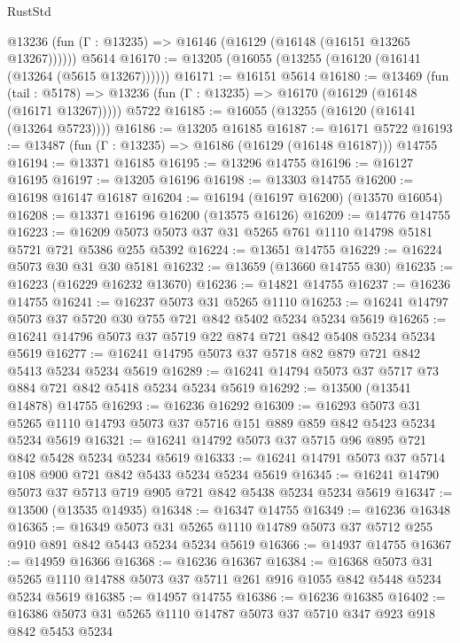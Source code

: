 \begin{lexlean}{RustStd}
\begin{coremodule}
      @13236 (fun (Γ : @13235) => @16146 (@16129 (@16148 (@16151 @13265 @13267))))))
    @5614
@16170 := @13205 (@16055 (@13255 (@16120 (@16141 (@13264 (@5615 @13267))))))
@16171 := @16151 @5614
@16180 := @13469
    (fun (tail : @5178) => @13236 (fun (Γ : @13235) => @16170 (@16129 (@16148 (@16171 @13267)))))
    @5722
@16185 := @16055 (@13255 (@16120 (@16141 (@13264 @5723))))
@16186 := @13205 @16185
@16187 := @16171 @5722
@16193 := @13487 (fun (Γ : @13235) => @16186 (@16129 (@16148 @16187))) @14755
@16194 := @13371 @16185
@16195 := @13296 @14755
@16196 := @16127 @16195
@16197 := @13205 @16196
@16198 := @13303 @14755
@16200 := @16198 @16147 @16187
@16204 := @16194 (@16197 @16200) (@13570 @16054)
@16208 := @13371 @16196 @16200 (@13575 @16126)
@16209 := @14776 @14755
@16223 := @16209 @5073 @5073 @37 @31 @5265 @761 @1110 @14798 @5181 @5721 @721 @5386 @255 @5392
@16224 := @13651 @14755
@16229 := @16224 @5073 @30 @31 @30 @5181
@16232 := @13659 (@13660 @14755 @30)
@16235 := @16223 (@16229 @16232 @13670)
@16236 := @14821 @14755
@16237 := @16236 @14755
@16241 := @16237 @5073 @31 @5265 @1110
@16253 := @16241 @14797 @5073 @37 @5720 @30 @755 @721 @842 @5402 @5234 @5234 @5619
@16265 := @16241 @14796 @5073 @37 @5719 @22 @874 @721 @842 @5408 @5234 @5234 @5619
@16277 := @16241 @14795 @5073 @37 @5718 @82 @879 @721 @842 @5413 @5234 @5234 @5619
@16289 := @16241 @14794 @5073 @37 @5717 @73 @884 @721 @842 @5418 @5234 @5234 @5619
@16292 := @13500 (@13541 @14878) @14755
@16293 := @16236 @16292
@16309 := @16293
    @5073
    @31
    @5265
    @1110
    @14793
    @5073
    @37
    @5716
    @151
    @889
    @859
    @842
    @5423
    @5234
    @5234
    @5619
@16321 := @16241 @14792 @5073 @37 @5715 @96 @895 @721 @842 @5428 @5234 @5234 @5619
@16333 := @16241 @14791 @5073 @37 @5714 @108 @900 @721 @842 @5433 @5234 @5234 @5619
@16345 := @16241 @14790 @5073 @37 @5713 @719 @905 @721 @842 @5438 @5234 @5234 @5619
@16347 := @13500 (@13535 @14935)
@16348 := @16347 @14755
@16349 := @16236 @16348
@16365 := @16349
    @5073
    @31
    @5265
    @1110
    @14789
    @5073
    @37
    @5712
    @255
    @910
    @891
    @842
    @5443
    @5234
    @5234
    @5619
@16366 := @14937 @14755
@16367 := @14959 @16366
@16368 := @16236 @16367
@16384 := @16368
    @5073
    @31
    @5265
    @1110
    @14788
    @5073
    @37
    @5711
    @261
    @916
    @1055
    @842
    @5448
    @5234
    @5234
    @5619
@16385 := @14957 @14755
@16386 := @16236 @16385
@16402 := @16386
    @5073
    @31
    @5265
    @1110
    @14787
    @5073
    @37
    @5710
    @347
    @923
    @918
    @842
    @5453
    @5234

\end{coremodule}
\end{lexlean}

